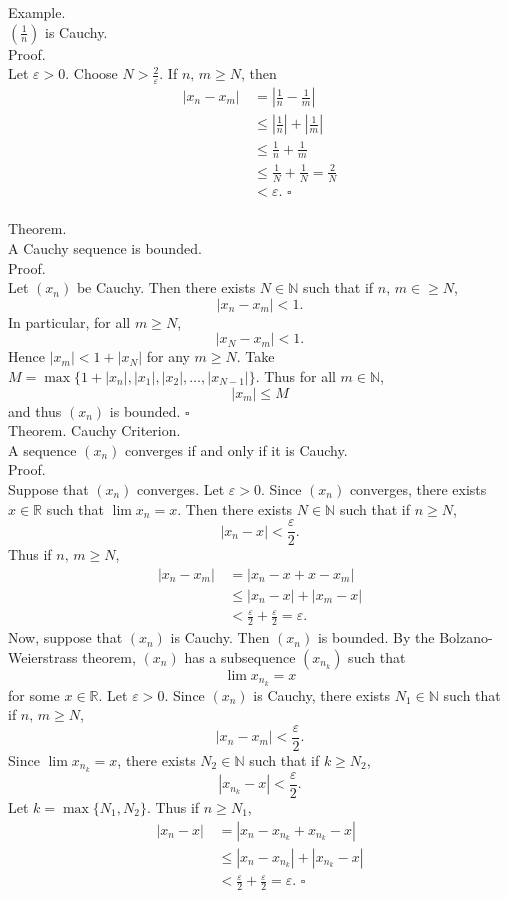 \documentclass[twocolumn]{article}
\newcommand{\qed}{$\square$}
\let\eps\varepsilon
\newcommand{\naturals}{\mathbb{N}}
\newcommand{\reals}{\mathbb{R}}
\begin{document}
Example. \\
$(\frac{1}{n})$ is Cauchy. \\
Proof. \\
Let $\eps > 0$. Choose $N > \frac{2}{\eps}$. If $n,\, m \geq N$, then
\begin{align*}
|x_n - x_m|\, 	& = \left| \frac{1}{n} - \frac{1}{m} \right| \\
				& \leq \left| \frac{1}{n} \right| + \left| \frac{1}{m} \right| \\
				&\leq \frac{1}{n} + \frac{1}{m} \\
				&\leq \frac{1}{N} + \frac{1}{N} = \frac{2}{N} \\
				&< \eps \text{. \qed}
\end{align*} \\

Theorem. \\
A Cauchy sequence is bounded. \\
Proof. \\
Let $(x_n)$ be Cauchy. Then there exists $N \in \naturals$ such that if $n,\, m \in \geq N$,
$$|x_n - x_m| < 1 \text{.}$$
In particular, for all $m \geq N$,
$$|x_N - x_m| < 1 \text{.}$$
Hence $|x_m| < 1 + |x_N|$ for any $m \geq N$. Take $M = \max \{ 1 + |x_n|, |x_1|, |x_2|, \ldots, |x_{N - 1}| \}$. Thus for all $m \in \naturals$,
$$|x_m| \leq M$$
and thus $(x_n)$ is bounded. \qed \\

Theorem. Cauchy Criterion. \\
A sequence $(x_n)$ converges if and only if it is Cauchy. \\
Proof. \\
Suppose that $(x_n)$ converges. Let $\eps > 0$. Since $(x_n)$ converges, there exists $x \in \reals$ such that $\lim x_n = x$. Then there exists $N \in \naturals$ such that if $n \geq N$,
$$|x_n - x| < \frac{\eps}{2} \text{.}$$
Thus if $n,\, m \geq N$,
\begin{align*}
|x_n - x_m|\, 	&= |x_n - x + x - x_m| \\
				&\leq |x_n - x| + |x_m - x| \\
				&< \frac{\eps}{2} + \frac{\eps}{2} = \eps \text{.}
\end{align*}
Now, suppose that $(x_n)$ is Cauchy. Then $(x_n)$ is bounded. By the Bolzano-Weierstrass theorem, $(x_n)$ has a subsequence $(x_{n_k})$ such that
$$\lim x_{n_k} = x$$
for some $x \in \reals$. Let $\eps > 0$. Since $(x_n)$ is Cauchy, there exists $N_1 \in \naturals$ such that if $n,\, m \geq N$,
$$|x_n - x_m| < \frac{\eps}{2} \text{.}$$
Since $\lim x_{n_k} = x$, there exists $N_2 \in \naturals$ such that if $k \geq N_2$,
$$|x_{n_k} - x| < \frac{\eps}{2} \text{.}$$
Let $k = \max \{ N_1, N_2 \}$. Thus if $n \geq N_1$,
\begin{align*}
|x_n - x|\,	&= |x_n - x_{n_k} + x_{n_k} - x| \\
			&\leq |x_n - x_{n_k}| + |x_{n_k} - x| \\
			&< \frac{\eps}{2} + \frac{\eps}{2} = \eps \text{. \qed}
\end{align*} \\
\end{document}
